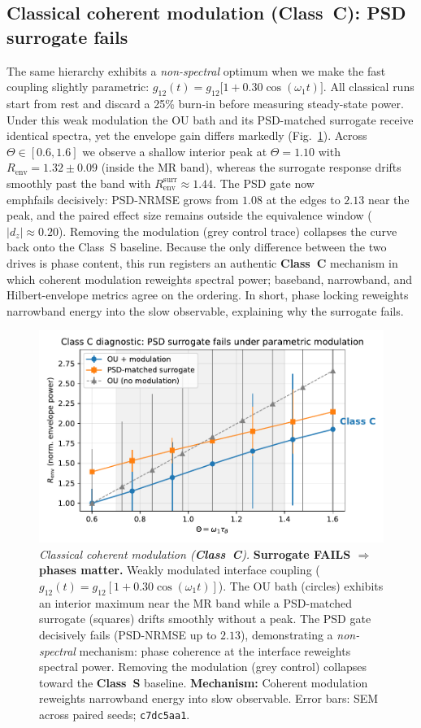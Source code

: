 \documentclass[11pt,letterpaper]{article}
\newcommand{\confighash}{c7dc5aa1}
\DeclareRobustCommand{\classS}{\textbf{Class~S}\xspace}
\DeclareRobustCommand{\classC}{\textbf{Class~C}\xspace}
\begin{document}
\subsection{Classical coherent modulation (\classC): PSD surrogate fails}
The same hierarchy exhibits a \emph{non-spectral} optimum when we make the fast coupling slightly parametric: $g_{12}(t)=g_{12}\bigl[1+0.30\cos(\omega_1 t)\bigr]$. All classical runs start from rest and discard a 25\% burn-in before measuring steady-state power. Under this weak modulation the OU bath and its PSD-matched surrogate receive identical spectra, yet the envelope gain differs markedly (Fig.~\ref{fig:classical_param}). Across $\Theta\in[0.6,1.6]$ we observe a shallow interior peak at $\Theta=1.10$ with $R_{\mathrm{env}}=1.32\pm0.09$ (inside the MR band), whereas the surrogate response drifts smoothly past the band with $R_{\mathrm{env}}^{\mathrm{surr}}\approx1.44$. The PSD gate now \\emph{fails} decisively: PSD-NRMSE grows from $1.08$ at the edges to $2.13$ near the peak, and the paired effect size remains outside the equivalence window ($|d_z|\approx0.20$). Removing the modulation (grey control trace) collapses the curve back onto the Class~S baseline. Because the only difference between the two drives is phase content, this run registers an authentic \classC{} mechanism in which coherent modulation reweights spectral power; baseband, narrowband, and Hilbert-envelope metrics agree on the ordering. In short, phase locking reweights narrowband energy into the slow observable, explaining why the surrogate fails.

\begin{figure}[t]
\centering
\includegraphics[width=0.8\linewidth]{figD_parametric_adaptive.pdf}
\caption{\emph{Classical coherent modulation (\classC).} \textbf{Surrogate FAILS $\Rightarrow$ phases matter.} Weakly modulated interface coupling ($g_{12}(t)=g_{12}[1+0.30\cos(\omega_1 t)]$). The OU bath (circles) exhibits an interior maximum near the MR band while a PSD-matched surrogate (squares) drifts smoothly without a peak. The PSD gate decisively fails (PSD-NRMSE up to $2.13$), demonstrating a \emph{non-spectral} mechanism: phase coherence at the interface reweights spectral power. Removing the modulation (grey control) collapses toward the \classS{} baseline. \textbf{Mechanism:} Coherent modulation reweights narrowband energy into slow observable. Error bars: SEM across paired seeds; \texttt{\confighash}.}
\label{fig:classical_param}
\end{figure}
\end{document}
